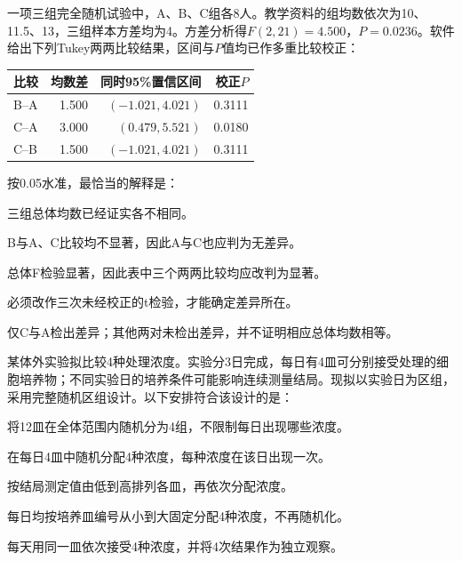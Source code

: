 \par\noindent\begin{minipage}{\linewidth}
一项三组完全随机试验中，A、B、C组各8人。教学资料的组均数依次为10、11.5、13，三组样本方差均为4。方差分析得\(F(2,21)=4.500\)，\(P=0.0236\)。软件给出下列Tukey两两比较结果，区间与\(P\)值均已作多重比较校正：
\begin{center}\begin{tabular}{lrrr}
\toprule 比较&均数差&同时95\%置信区间&校正\(P\)\\\midrule
B--A&1.500&\((-1.021,4.021)\)&0.3111\\
C--A&3.000&\((0.479,5.521)\)&0.0180\\
C--B&1.500&\((-1.021,4.021)\)&0.3111\\\bottomrule
\end{tabular}\end{center}
按0.05水准，最恰当的解释是：
\begin{choices}
\item 三组总体均数已经证实各不相同。
\item B与A、C比较均不显著，因此A与C也应判为无差异。
\item 总体F检验显著，因此表中三个两两比较均应改判为显著。
\item 必须改作三次未经校正的t检验，才能确定差异所在。
\item 仅C与A检出差异；其他两对未检出差异，并不证明相应总体均数相等。
\end{choices}
\end{minipage}\par\medskip

\par\noindent\begin{minipage}{\linewidth}
某体外实验拟比较4种处理浓度。实验分3日完成，每日有4皿可分别接受处理的细胞培养物；不同实验日的培养条件可能影响连续测量结局。现拟以实验日为区组，采用完整随机区组设计。以下安排符合该设计的是：
\begin{choices}
\item 将12皿在全体范围内随机分为4组，不限制每日出现哪些浓度。
\item 在每日4皿中随机分配4种浓度，每种浓度在该日出现一次。
\item 按结局测定值由低到高排列各皿，再依次分配浓度。
\item 每日均按培养皿编号从小到大固定分配4种浓度，不再随机化。
\item 每天用同一皿依次接受4种浓度，并将4次结果作为独立观察。
\end{choices}
\end{minipage}\par\medskip

